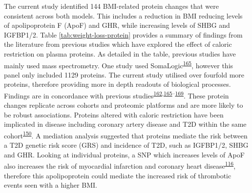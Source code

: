 \documentclass[11pt,twoside]{bristolthesis}
\begin{document}
The current study identified 144 BMI-related protein changes that were consistent across both models. This includes a reduction in BMI reducing levels of apolipoprotein F (ApoF) and GHR, while increasing levels of SHBG and IGFBP1/2. Table \ref{tab:weight-loss-protein} provides a summary of findings from the literature from previous studies which have explored the effect of caloric restriction on plasma proteins. As detailed in the table, previous studies have mainly used mass spectrometry. One study used SomaLogic\textsuperscript{\protect\hyperlink{ref-Carayol2017}{165}}, however this panel only included 1129 proteins. The current study utilised over fourfold more proteins, therefore providing more in depth readouts of biological processes. Findings are in concordance with previous studies\textsuperscript{\protect\hyperlink{ref-Figarska2020}{162},\protect\hyperlink{ref-Carayol2017}{165}--\protect\hyperlink{ref-Bruderer2019}{169}}. These protein changes replicate across cohorts and proteomic platforms and are more likely to be robust associations. Proteins altered with caloric restriction have been implicated in disease including coronary artery disease and T2D within the same cohort\textsuperscript{\protect\hyperlink{ref-Ritchie2019}{150}}. A mediation analysis suggested that proteins mediate the risk between a T2D genetic risk score (GRS) and incidence of T2D, such as IGFBP1/2, SHBG and GHR. Looking at individual proteins, a SNP which increases levels of ApoF also increases the risk of myocardial infarction and coronary heart disease\textsuperscript{\protect\hyperlink{ref-Liu2021}{116}}, therefore this apolipoprotein could mediate the increased risk of thrombotic events seen with a higher BMI.
\end{document}
